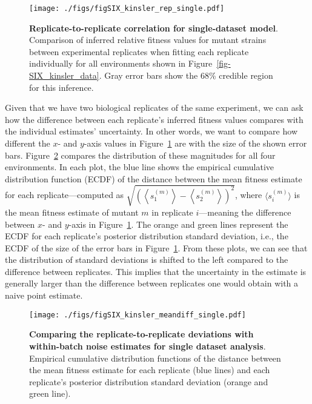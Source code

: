 \documentclass[
]{scrartcl}
\begin{document}
\begin{refsegment}
\begin{figure}

{\centering \texttt{[image: ./figs/figSIX\_kinsler\_rep\_single.pdf]}

}

\caption{\label{fig-SIX_kinsler_rep_single}\textbf{Replicate-to-replicate
correlation for single-dataset model}. Comparison of inferred relative
fitness values for mutant strains between experimental replicates when
fitting each replicate individually for all environments shown in
Figure~\ref{fig-SIX_kinsler_data}. Gray error bars show the 68\%
credible region for this inference.}

\end{figure}

Given that we have two biological replicates of the same experiment, we
can ask how the difference between each replicate's inferred fitness
values compares with the individual estimates' uncertainty. In other
words, we want to compare how different the \(x\)- and \(y\)-axis values
in Figure~\ref{fig-SIX_kinsler_rep_single} are with the size of the
shown error bars. Figure~\ref{fig-SIX_kinsler_meandiff_single} compares
the distribution of these magnitudes for all four environments. In each
plot, the blue line shows the empirical cumulative distribution function
(ECDF) of the distance between the mean fitness estimate for each
replicate---computed as
\(\sqrt{\left( \left\langle s_1^{(m)}\right\rangle - \left\langle s_2^{(m)}\right\rangle \right)^2}\),
where \(\langle s_i^{(m)}\rangle\) is the mean fitness estimate of
mutant \(m\) in replicate \(i\)---meaning the difference between \(x\)-
and \(y\)-axis in Figure~\ref{fig-SIX_kinsler_rep_single}. The orange
and green lines represent the ECDF for each replicate's posterior
distribution standard deviation, i.e., the ECDF of the size of the error
bars in Figure~\ref{fig-SIX_kinsler_rep_single}. From these plots, we
can see that the distribution of standard deviations is shifted to the
left compared to the difference between replicates. This implies that
the uncertainty in the estimate is generally larger than the difference
between replicates one would obtain with a naive point estimate.

\begin{figure}

{\centering \texttt{[image: ./figs/figSIX\_kinsler\_meandiff\_single.pdf]}

}

\caption{\label{fig-SIX_kinsler_meandiff_single}\textbf{Comparing the
replicate-to-replicate deviations with within-batch noise estimates for
single dataset analysis}. Empirical cumulative distribution functions of
the distance between the mean fitness estimate for each replicate (blue
lines) and each replicate's posterior distribution standard deviation
(orange and green line).}


\end{figure}
\end{refsegment}
\end{document}
